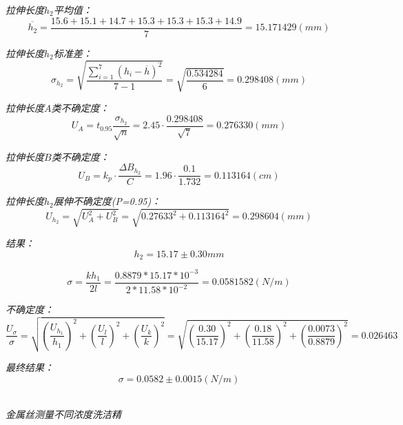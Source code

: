 \documentclass[UTF8]{ctexart}
\begin{document}
    \emph{拉伸长度$h_2$平均值：}
    \begin{equation*}
        \overline{h_2}=\frac{15.6	+15.1+	14.7+	15.3	+15.3+	15.3+	14.9}{7} =15.171429(mm)
    \end{equation*}

    \emph{拉伸长度$h_2$标准差：}
    \begin{equation*}
        \sigma _{h_2}=\sqrt{\frac{\sum_{i=1}^7 (h_i-\overline{h})^2}{7-1}}= \sqrt{\frac{0.534284}{6}} = 0.298408(mm)
    \end{equation*}

    \emph{拉伸长度$A$类不确定度：}
    \begin{equation*}
        U_A=t_{0.95}\frac{\sigma_{h_2}}{\sqrt{n}}=2.45·\frac{0.298408}{\sqrt{7}}=0.276330(mm)
    \end{equation*}

    \emph{拉伸长度$B$类不确定度：}
    \begin{equation*}
        U_B=k_p·\frac{\varDelta B_{h_2}}{C}=1.96·\frac{0.1}{1.732}=0.113164(cm)
    \end{equation*}

    \emph{拉伸长度$h_2$展伸不确定度(P=0.95)：}
    \begin{equation*}
       U_{h_2}=\sqrt{U_A^2+U_B^2}=\sqrt{0.27633^2+0.113164^2}= 0.298604(mm)
    \end{equation*}

    \emph{结果：}
    \begin{equation*}
        h_2=15.17±0.30mm 
    \end{equation*}

    \begin{equation*}
        \sigma = \frac{kh_1}{2l} = \frac{0.8879*15.17*10^{-3}}{2*11.58*10^{-2}} = 0.0581582(N/m)
    \end{equation*}
    
    \emph{不确定度：}
    \begin{equation*}
        \frac{U_{\sigma}}{\sigma}=\sqrt{(\frac{U_{h_1}}{h_1})^2+(\frac{U_l}{l})^2+(\frac{U_k}{k})^2}=
        \sqrt{(\frac{0.30}{15.17})^2+(\frac{0.18}{11.58})^2+(\frac{0.0073}{0.8879})^2}= 0.026463
    \end{equation*}

    \emph{最终结果：}
    \begin{equation}
        \sigma=0.0582±0.0015(N/m)
    \end{equation}


    \begin{center}
        \emph{\\[0.01cm]金属丝测量不同浓度洗洁精}
    \end{center} 
\end{document}
